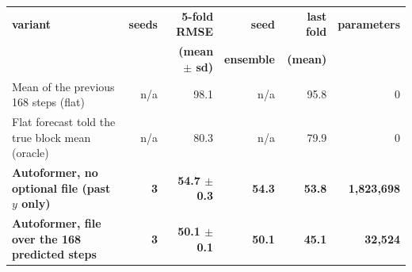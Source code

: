 \begin{tabular}{@{}p{2.7in}rrrrr@{}}
\toprule
\textbf{variant} & \textbf{seeds} & \textbf{5-fold RMSE} & \textbf{seed} & \textbf{last fold} & \textbf{parameters} \\
 & & \textbf{(mean $\pm$ sd)} & \textbf{ensemble} & \textbf{(mean)} & \\
\midrule
Mean of the previous 168 steps (flat) & n/a & 98.1 & n/a & 95.8 & 0 \\
Flat forecast told the true block mean (oracle) & n/a & 80.3 & n/a & 79.9 & 0 \\
\midrule
\textbf{Autoformer, no optional file (past $y$ only)} & \textbf{3} & \textbf{54.7 $\pm$ 0.3} & \textbf{54.3} & \textbf{53.8} & \textbf{1{,}823{,}698} \\
\textbf{Autoformer, file over the 168 predicted steps} & \textbf{3} & \textbf{50.1 $\pm$ 0.1} & \textbf{50.1} & \textbf{45.1} & \textbf{32{,}524} \\
\bottomrule
\end{tabular}
